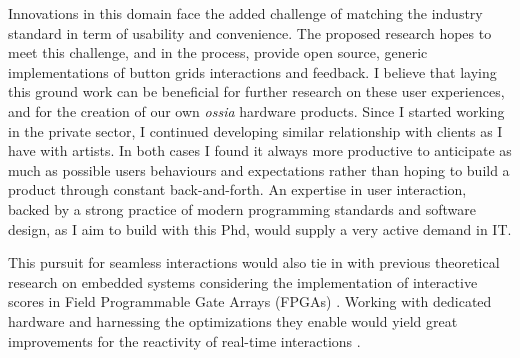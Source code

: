 \documentclass[journal,onecolumn]{IEEEtran}
\begin{document}
Innovations in this domain face the added challenge of matching the industry standard in term of usability and convenience. The proposed research hopes to meet this challenge, and in the process, provide open source, generic implementations of button grids interactions and feedback. I believe that laying this ground work can be beneficial for further research on these user experiences, and for the creation of our own \textit{ossia} hardware products.
Since I started working in the private sector, I continued developing similar relationship with clients as I have with artists. In both cases I found it always more productive to anticipate as much as possible users behaviours and expectations rather than hoping to build a product through constant back-and-forth. An expertise in user interaction, backed by a strong practice of modern programming standards and software design, as I aim to build with this Phd, would supply a very active demand in IT.

This pursuit for seamless interactions would also tie in with previous theoretical research on embedded systems considering the implementation of interactive scores in Field Programmable Gate Arrays (FPGAs) \cite{arias:fpga}. Working with dedicated hardware and harnessing the optimizations they enable would yield great improvements for the reactivity of real-time interactions \cite{popoff:fpga}. 

%
%
\end{document}
